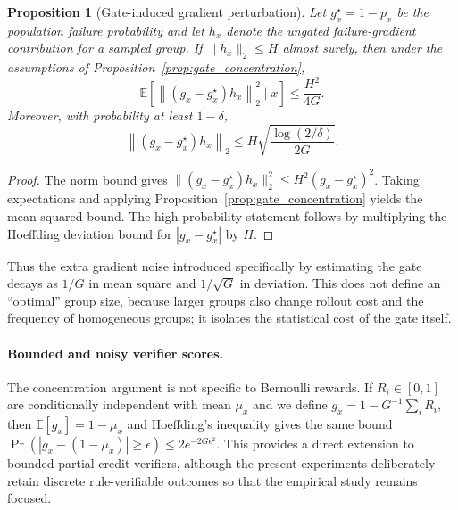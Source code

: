 \documentclass{article}
\newcommand{\E}{\mathbb{E}}
\newtheorem{proposition}{Proposition}
\begin{document}
\begin{proposition}[Gate-induced gradient perturbation]
\label{prop:gate_gradient}
Let $g_x^\star=1-p_x$ be the population failure probability and let $h_x$ denote the ungated failure-gradient contribution for a sampled group. If $\|h_x\|_2\le H$ almost surely, then under the assumptions of Proposition~\ref{prop:gate_concentration},
\begin{equation}
\E\!\left[\left\|(g_x-g_x^\star)h_x\right\|_2^2\mid x\right]\le\frac{H^2}{4G}.
\end{equation}
Moreover, with probability at least $1-\delta$,
\begin{equation}
\left\|(g_x-g_x^\star)h_x\right\|_2
\le H\sqrt{\frac{\log(2/\delta)}{2G}}.
\end{equation}
\end{proposition}
\begin{proof}
The norm bound gives $\|(g_x-g_x^\star)h_x\|_2^2\le H^2(g_x-g_x^\star)^2$. Taking expectations and applying Proposition~\ref{prop:gate_concentration} yields the mean-squared bound. The high-probability statement follows by multiplying the Hoeffding deviation bound for $|g_x-g_x^\star|$ by $H$.
\end{proof}
Thus the extra gradient noise introduced specifically by estimating the gate decays as $1/G$ in mean square and $1/\sqrt G$ in deviation. This does not define an ``optimal'' group size, because larger groups also change rollout cost and the frequency of homogeneous groups; it isolates the statistical cost of the gate itself.


\paragraph{Bounded and noisy verifier scores.}
The concentration argument is not specific to Bernoulli rewards. If $R_i\in[0,1]$ are conditionally independent with mean $\mu_x$ and we define $g_x=1-G^{-1}\sum_iR_i$, then $\E[g_x]=1-\mu_x$ and Hoeffding's inequality gives the same bound $\Pr(|g_x-(1-\mu_x)|\ge\epsilon)\le2e^{-2G\epsilon^2}$. This provides a direct extension to bounded partial-credit verifiers, although the present experiments deliberately retain discrete rule-verifiable outcomes so that the empirical study remains focused.
\end{document}
